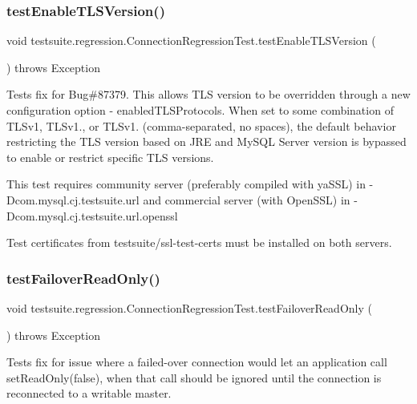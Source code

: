 \subsubsection{\texorpdfstring{test\+Enable\+T\+L\+S\+Version()}{testEnableTLSVersion()}}
{\footnotesize\ttfamily void testsuite.\+regression.\+Connection\+Regression\+Test.\+test\+Enable\+T\+L\+S\+Version (\begin{DoxyParamCaption}{ }\end{DoxyParamCaption}) throws Exception}

Tests fix for Bug\#87379. This allows T\+LS version to be overridden through a new configuration option -\/ enabled\+T\+L\+S\+Protocols. When set to some combination of T\+L\+Sv1, T\+L\+Sv1., or T\+L\+Sv1. (comma-\/separated, no spaces), the default behavior restricting the T\+LS version based on J\+RE and My\+S\+QL Server version is bypassed to enable or restrict specific T\+LS versions.

This test requires community server (preferably compiled with ya\+S\+SL) in -\/\+Dcom.\+mysql.\+cj.\+testsuite.\+url and commercial server (with Open\+S\+SL) in -\/\+Dcom.\+mysql.\+cj.\+testsuite.\+url.\+openssl

Test certificates from testsuite/ssl-\/test-\/certs must be installed on both servers. \mbox{\label{classtestsuite_1_1regression_1_1_connection_regression_test_a9b67a76ffbc55986621776106705e212}} 
\subsubsection{\texorpdfstring{test\+Failover\+Read\+Only()}{testFailoverReadOnly()}}
{\footnotesize\ttfamily void testsuite.\+regression.\+Connection\+Regression\+Test.\+test\+Failover\+Read\+Only (\begin{DoxyParamCaption}{ }\end{DoxyParamCaption}) throws Exception}

Tests fix for issue where a failed-\/over connection would let an application call set\+Read\+Only(false), when that call should be ignored until the connection is reconnected to a writable master.


